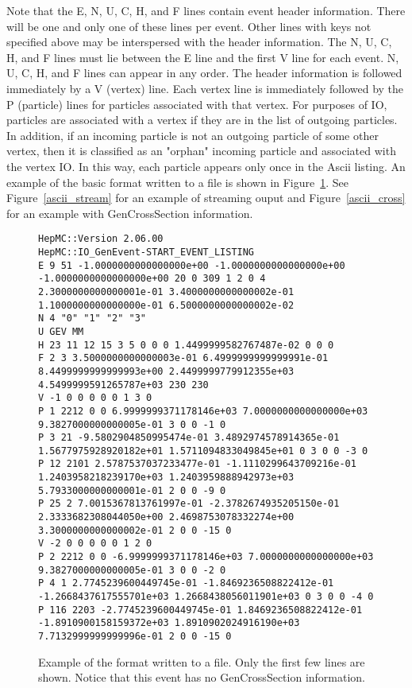 \documentclass[11pt,letterpaper]{article}
\begin{document}
Note that the E, N, U, C, H, and F lines contain event header information.
There will be one and only one of these lines per event.
Other lines with keys not specified above may be interspersed with the header 
information.
The N, U, C, H, and F lines must lie between the E line and the first V line
for each event.  N, U, C, H, and F lines can appear in any order.
The header information is followed immediately by a V (vertex) line.
Each vertex line is immediately followed by the P (particle) lines 
for particles associated with that vertex.  
For purposes of IO, particles are associated with a vertex if they
are in the list of outgoing particles.
In addition, if an incoming particle is not an outgoing particle of 
some other vertex, then it is classified as an "orphan" incoming particle
and associated with the vertex IO.
In this way, each particle appears only once in the Ascii listing.
An example of the basic format written to a file is shown in Figure~\ref{ascii_format}.
See Figure~\ref{ascii_stream} for an example of streaming ouput and 
Figure~\ref{ascii_cross} for an example with GenCrossSection information.

\begin{figure}[h]
  \begin{center}
{\tiny \begin{verbatim}
HepMC::Version 2.06.00
HepMC::IO_GenEvent-START_EVENT_LISTING
E 9 51 -1.0000000000000000e+00 -1.0000000000000000e+00 -1.0000000000000000e+00 20 0 309 1 2 0 4 2.3000000000000001e-01 3.4000000000000002e-01 1.1000000000000000e-01 6.5000000000000002e-02
N 4 "0" "1" "2" "3" 
U GEV MM
H 23 11 12 15 3 5 0 0 0 1.4499999582767487e-02 0 0 0
F 2 3 3.5000000000000003e-01 6.4999999999999991e-01 8.4499999999999993e+00 2.4499999779912355e+03 4.5499999591265787e+03 230 230
V -1 0 0 0 0 0 1 3 0
P 1 2212 0 0 6.9999999371178146e+03 7.0000000000000000e+03 9.3827000000000005e-01 3 0 0 -1 0
P 3 21 -9.5802904850995474e-01 3.4892974578914365e-01 1.5677975928920182e+01 1.5711094833049845e+01 0 3 0 0 -3 0
P 12 2101 2.5787537037233477e-01 -1.1110299643709216e-01 1.2403958218239170e+03 1.2403959888942973e+03 5.7933000000000001e-01 2 0 0 -9 0
P 25 2 7.0015367813761997e-01 -2.3782674935205150e-01 2.3333682308044050e+00 2.4698753078332274e+00 3.3000000000000002e-01 2 0 0 -15 0
V -2 0 0 0 0 0 1 2 0
P 2 2212 0 0 -6.9999999371178146e+03 7.0000000000000000e+03 9.3827000000000005e-01 3 0 0 -2 0
P 4 1 2.7745239600449745e-01 -1.8469236508822412e-01 -1.2668437617555701e+03 1.2668438056011901e+03 0 3 0 0 -4 0
P 116 2203 -2.7745239600449745e-01 1.8469236508822412e-01 -1.8910900158159372e+03 1.8910902024916190e+03 7.7132999999999996e-01 2 0 0 -15 0
\end{verbatim}}
  \end{center}
  \caption[Example of ascii format]
          {\label{ascii_format} Example of the format written to a file.  
           Only the first few lines are shown. 
	   Notice that this event has no GenCrossSection information. }
\end{figure}
\end{document}
